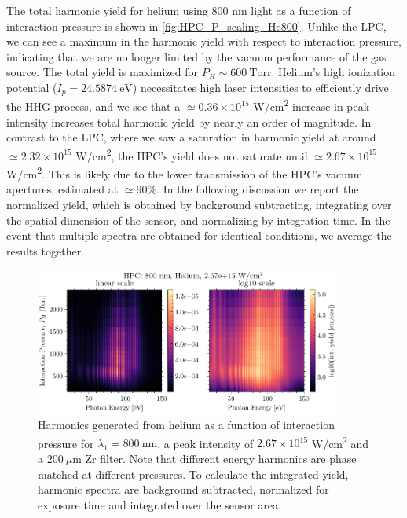 The total harmonic yield for helium using 800 nm light as a function of interaction pressure is shown in \cref{fig:HPC_P_scaling_He800}. Unlike the LPC, we can see a maximum in the harmonic yield with respect to interaction pressure, indicating that we are no longer limited by the vacuum performance of the gas source. The total yield is maximized for $P_H \sim 600 \ \textrm{Torr}$. Helium's high ionization potential ($I_p = 24.5874 \ \textrm{eV}$) necessitates high laser intensities to efficiently drive the HHG process, and we see that a $\simeq 0.36 \times 10^{15}$ W/cm\textsuperscript{2} increase in peak intensity increases total harmonic yield by nearly an order of magnitude. In contrast to the LPC, where we saw a saturation in harmonic yield at around $\simeq 2.32 \times 10^{15}$ W/cm\textsuperscript{2}, the HPC's yield does not saturate until $\simeq 2.67 \times 10^{15}$ W/cm\textsuperscript{2}. This is likely due to the lower transmission of the HPC's vacuum apertures, estimated at $\simeq 90 \%$. In the following discussion we report the normalized yield, which is obtained by background subtracting, integrating over the spatial dimension of the sensor, and normalizing by integration time. In the event that multiple spectra are obtained for identical conditions, we average the results together.

\begin{figure}
	\centering
	\includegraphics[width=0.9\textwidth]{figures/chap3/HPC_800nm_He_spectrogram.pdf}
	\caption{Harmonics generated from helium as a function of interaction pressure for $\lambda_1 = 800 \ \textrm{nm}$, a peak intensity of $2.67 \times 10^{15}$ W/cm\textsuperscript{2} and a $200 \ \mu \textrm{m}$ Zr filter. Note that different energy harmonics are phase matched at different pressures. To calculate the integrated yield, harmonic spectra are background subtracted, normalized for exposure time and integrated over the sensor area.}
	\label{fig:HPC_800nm_He_spectrogram}
\end{figure}

